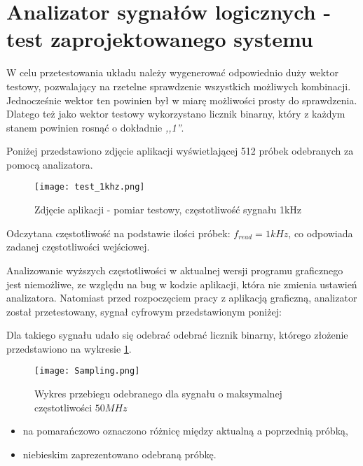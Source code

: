\section{Analizator sygnałów logicznych - test zaprojektowanego systemu}
    W celu przetestowania układu należy wygenerować odpowiednio duży wektor testowy,
    pozwalający na rzetelne sprawdzenie wszystkich możliwych kombinacji.
    Jednocześnie wektor ten powinien był w miarę możliwości prosty do sprawdzenia.
    Dlatego też jako wektor testowy wykorzystano licznik binarny, który z każdym stanem powinien rosnąć o dokładnie \textit{,,1''}.

    Poniżej przedstawiono zdjęcie aplikacji wyświetlającej 512 próbek odebranych za pomocą analizatora.
    \begin{figure}[!ht]
        \centering
        \texttt{[image: test\_1khz.png]}
        \caption{Zdjęcie aplikacji - pomiar testowy, częstotliwość sygnału 1kHz}
    \end{figure}

    Odczytana częstotliwość na podstawie ilości próbek: $f_{read} = 1kHz$, co odpowiada zadanej częstotliwości wejściowej.

    Analizowanie wyższych częstotliwości w aktualnej wersji programu graficznego jest niemożliwe, ze względu na bug w kodzie aplikacji, która nie zmienia ustawień analizatora.
    Natomiast przed rozpoczęciem pracy z aplikacją graficzną, analizator został przetestowany, sygnał cyfrowym przedstawionym poniżej:
    \begin{figure}[!ht]
        \centering
    \end{figure}

    Dla takiego sygnału udało się odebrać odebrać licznik binarny, którego złożenie przedstawiono na wykresie \ref{fig:sampling}.
    \newpage
    \begin{figure}[!ht]
        \centering
        \texttt{[image: Sampling.png]}
        \caption{Wykres przebiegu odebranego dla sygnału o maksymalnej częstotliwości $50MHz$}
        \label{fig:sampling}
    \end{figure}
    \begin{itemize}
        \item na pomarańczowo oznaczono różnicę między aktualną a poprzednią próbką,
        \item niebieskim zaprezentowano odebraną próbkę.
    \end{itemize}

